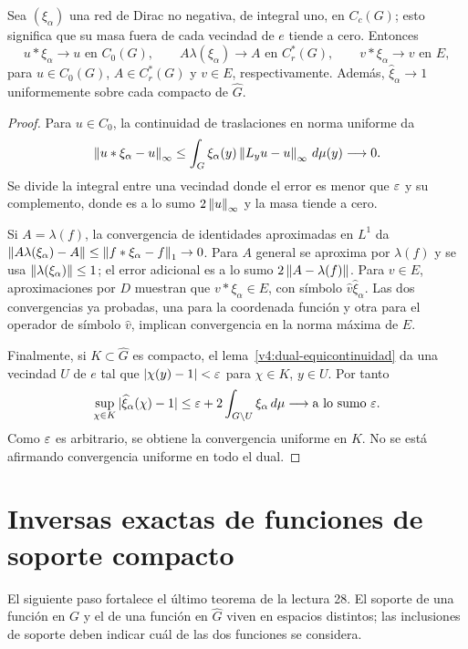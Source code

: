 \begin{proposicion}\label{v4:dirac-tres-espacios}
Sea $(\xi_\alpha)$ una red de Dirac no negativa, de integral uno, en $C_c(G)$; esto significa que su masa fuera de cada vecindad de $e$ tiende a cero. Entonces
\[
 u*\xi_\alpha\to u\text{ en }C_0(G),\qquad
 A\lambda(\xi_\alpha)\to A\text{ en }C_r^*(G),\qquad
 v*\xi_\alpha\to v\text{ en }E,
\]
para $u\in C_0(G)$, $A\in C_r^*(G)$ y $v\in E$, respectivamente. Además, $\widehat\xi_\alpha\to1$ uniformemente sobre cada compacto de $\widehat G$.
\end{proposicion}
\begin{proof}
Para $u\in C_0$, la continuidad de traslaciones en norma uniforme da
\[
 \left\lVert u*\xi_\alpha-u\right\rVert_\infty
 \le\int_G\xi_\alpha(y)\left\lVert L_yu-u\right\rVert_\infty\,d\mu(y)\longrightarrow0.
\]
Se divide la integral entre una vecindad donde el error es menor que $\varepsilon$ y su complemento, donde es a lo sumo $2\left\lVert u\right\rVert_\infty$ y la masa tiende a cero.

Si $A=\lambda(f)$, la convergencia de identidades aproximadas en $L^1$ da
$\left\lVert A\lambda(\xi_\alpha)-A\right\rVert\le\left\lVert f*\xi_\alpha-f\right\rVert_1\to0$.
Para $A$ general se aproxima por $\lambda(f)$ y se usa $\left\lVert\lambda(\xi_\alpha)\right\rVert\le1$; el error adicional es a lo sumo $2\left\lVert A-\lambda(f)\right\rVert$. Para $v\in E$, aproximaciones por $D$ muestran que $v*\xi_\alpha\in E$, con símbolo $\widehat v\widehat\xi_\alpha$. Las dos convergencias ya probadas, una para la coordenada función y otra para el operador de símbolo $\widehat v$, implican convergencia en la norma máxima de $E$.

Finalmente, si $K\subset\widehat G$ es compacto, el lema~\ref{v4:dual-equicontinuidad} da una vecindad $U$ de $e$ tal que $|\chi(y)-1|<\varepsilon$ para $\chi\in K$, $y\in U$. Por tanto
\[
 \sup_{\chi\in K}|\widehat\xi_\alpha(\chi)-1|
 \le\varepsilon+2\int_{G\setminus U}\xi_\alpha\,d\mu\longrightarrow\text{a lo sumo }\varepsilon.
\]
Como $\varepsilon$ es arbitrario, se obtiene la convergencia uniforme en $K$. No se está afirmando convergencia uniforme en todo el dual.
\end{proof}

\section{Inversas exactas de funciones de soporte compacto}
El siguiente paso fortalece el último teorema de la lectura 28. El soporte de una función en $G$ y el de una función en $\widehat G$ viven en espacios distintos; las inclusiones de soporte deben indicar cuál de las dos funciones se considera.

